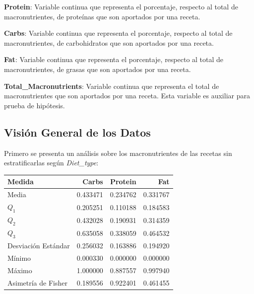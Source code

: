 \documentclass[12pt,a4paper]{article}
\begin{document}
{{\begin{itemize}[label=\textbullet]
{                \item \textbf{Protein}: Variable continua que representa el 
                porcentaje, respecto al total de macronutrientes, de proteínas que son 
                aportados por una receta.

                \item \textbf{Carbs}: Variable continua que representa el 
                porcentaje, respecto al total de macronutrientes, de carbohidratos que 
                son aportados por una receta.
                
                \item \textbf{Fat}: Variable continua que representa el 
                porcentaje, respecto al total de macronutrientes, de grasas que son 
                aportados por una receta.
                
                \item \textbf{Total\_Macronutrients}: Variable continua que representa 
                el total de macronutrientes que son aportados por una receta. Esta variable 
                es auxiliar para prueba de hipótesis.
            }
            \end{itemize}
        }

        \subsection{Visión General de los Datos}
        {
            Primero se presenta un análisis sobre los macronutrientes de 
            las recetas sin estratificarlas según \emph{Diet\_type}:

            \begin{center}
                \begin{xtabular}{w{l}{}|rrr}
                \toprule
                    Medida & Carbs & Protein & Fat \\  
                \midrule
                    Media               & 0.433471 & 0.234762 & 0.331767 \\
                    $Q_1$               & 0.205251 & 0.110188 & 0.184583 \\
                    $Q_2$               & 0.432028 & 0.190931 & 0.314359 \\
                    $Q_3$               & 0.635058 & 0.338059 & 0.464532 \\
                    Desviación Estándar & 0.256032 & 0.163886 & 0.194920 \\
                    Mínimo              & 0.000330 & 0.000000 & 0.000000 \\
                    Máximo              & 1.000000 & 0.887557 & 0.997940 \\
                    Asimetría de Fisher & 0.189556 & 0.922401 & 0.461455 \\
                \bottomrule
                \end{xtabular}
            \end{center}

}}
\end{document}
